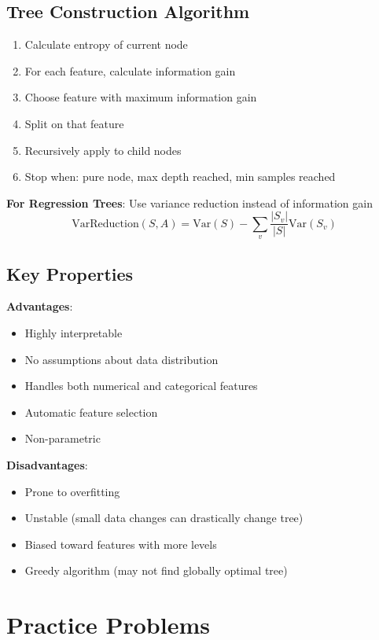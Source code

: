 \documentclass{article}
\begin{document}
\subsection{Tree Construction Algorithm}

\begin{enumerate}
    \item Calculate entropy of current node
    \item For each feature, calculate information gain
    \item Choose feature with maximum information gain
    \item Split on that feature
    \item Recursively apply to child nodes
    \item Stop when: pure node, max depth reached, min samples reached
\end{enumerate}

\textbf{For Regression Trees}: Use variance reduction instead of information gain
$$\text{VarReduction}(S, A) = \text{Var}(S) - \sum_{v} \frac{|S_v|}{|S|} \text{Var}(S_v)$$

\subsection{Key Properties}

\textbf{Advantages}:
\begin{itemize}
    \item Highly interpretable
    \item No assumptions about data distribution
    \item Handles both numerical and categorical features
    \item Automatic feature selection
    \item Non-parametric
\end{itemize}

\textbf{Disadvantages}:
\begin{itemize}
    \item Prone to overfitting
    \item Unstable (small data changes can drastically change tree)
    \item Biased toward features with more levels
    \item Greedy algorithm (may not find globally optimal tree)
\end{itemize}

\section{Practice Problems}
\end{document}
